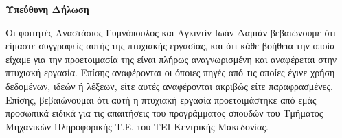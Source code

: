 \thispagestyle{plain}
\begin{center}
    \Large
    \textbf{Υπεύθυνη Δήλωση}
\end{center}
\quad Οι φοιτητές Αναστάσιος Γυμνόπουλος και Αγκιντίν Ιωάν-Δαμιάν βεβαιώνουμε ότι είμαστε συγγραφείς αυτής της πτυχιακής εργασίας, και ότι κάθε βοήθεια την οποία είχαμε για την προετοιμασία της είναι πλήρως αναγνωρισμένη και αναφέρεται στην πτυχιακή
εργασία. Επίσης αναφέρονται οι όποιες πηγές από τις οποίες έγινε χρήση δεδομένων, ιδεών
ή λέξεων, είτε αυτές αναφέρονται ακριβώς είτε παραφρασμένες. Επίσης, βεβαιώνουμαι ότι αυτή
η πτυχιακή εργασία προετοιμάστηκε από εμάς προσωπικά ειδικά για τις απαιτήσεις του προγράμματος σπουδών του Τμήματος Μηχανικών Πληροφορικής Τ.Ε. του ΤΕΙ Κεντρικής Μακεδονίας.